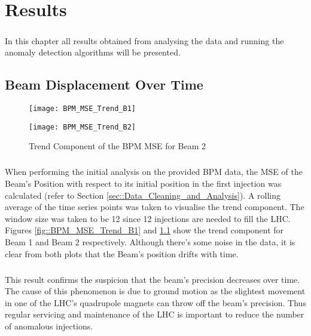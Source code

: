 \chapter{Results}
\label{chp4}

\paragraph{ }In this chapter all results obtained from analysing the data and running the anomaly detection algorithms will be presented. 

\section{Beam Displacement Over Time}

\begin{figure}[!b]
	\begin{minipage}[b]{0.475\linewidth}
		\centering
		\texttt{[image: BPM\_MSE\_Trend\_B1]}
		\caption[BPM MSE Trend B1]{Trend Component of the BPM MSE for Beam 1}
		\label{fig::BPM_MSE_Trend_B1}
	\end{minipage}	
	\hspace{0.25cm}
	\begin{minipage}[b]{0.475\linewidth}
		\centering
		\texttt{[image: BPM\_MSE\_Trend\_B2]}
		\caption[BPM MSE Trend B2]{Trend Component of the BPM MSE for Beam 2}
		\label{fig::BPM_MSE_Trend_B2}
	\end{minipage}	
\end{figure}

\paragraph{ }When performing the initial analysis on the provided \acs{BPM} data, the \acs{MSE} of the Beam's Position with respect to its initial position in the first injection was calculated (refer to Section \ref{sec::Data_Cleaning_and_Analysis}). A rolling average of the time series points was taken to visualise the trend component. The window size was taken to be 12 since 12 injections are needed to fill the \acs{LHC}. Figures \ref{fig::BPM_MSE_Trend_B1} and \ref{fig::BPM_MSE_Trend_B2} show the trend component for Beam 1 and Beam 2 respectively. Although there's some noise in the data, it is clear from both plots that the Beam's position drifts with time.

\paragraph{ }This result confirms the suspicion that the beam's precision decreases over time. The cause of this phenomenon is due to ground motion as the slightest movement in one of the \acs{LHC}'s quadrupole magnets can throw off the beam's precision. Thus regular servicing and maintenance of the \acs{LHC} is important to reduce the number of anomalous injections.

